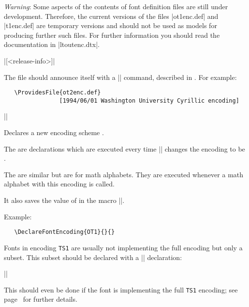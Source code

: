 \documentclass{ltxguide}[1995/11/28]
\begin{document}
\emph{Warning}: Some aspects of the contents of font definition files
are still under development.  Therefore, the current versions of the
files |ot1enc.def| and |t1enc.def| are temporary versions and should not
be used as models for producing further such files.  For further
information you should read the documentation in |ltoutenc.dtx|.

\begin{decl}
  |[<release-info>]|
\end{decl}
The file should announce itself with a |\ProvidesFile| command,
described in \emph{\clsguide}.  For example:
\begin{verbatim}
   \ProvidesFile{ot2enc.def}
                [1994/06/01 Washington University Cyrillic encoding]
\end{verbatim}


\begin{decl}
  |\DeclareFontEncoding|  
\end{decl}

Declares a new encoding scheme .

The  are declarations which are executed every time
|\selectfont| changes the encoding to be .

The  are similar but are for math alphabets. They are
executed whenever a math alphabet with this encoding is called.

It also saves the value of  in the macro
|\LastDeclaredEncoding|.

\newpage

Example:
\begin{verbatim}
   \DeclareFontEncoding{OT1}{}{}
\end{verbatim}

Fonts in encoding \texttt{TS1} are usually not implementing the full encoding but only a subset.
This subset should be declared  with a |\DeclareEncodingSubset|
declaration:

\begin{decl}
  |\DeclareEncodingSubset| 
\end{decl}
This should even be done if the font is implementing the full
\texttt{TS1} encoding; see page~\pageref{page:declareencodingsubset} for
further details.
\end{document}
